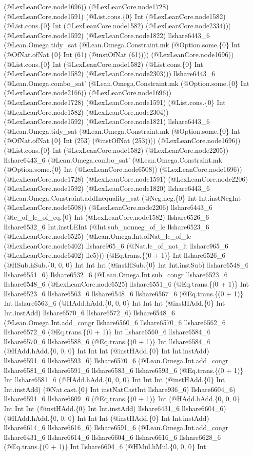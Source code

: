 \documentclass[11pt]{article}
\begin{document}
(@LexLeanCore.node1696)) (@LexLeanCore.node1728) (@LexLeanCore.node1591) (@List.cons.\{0\} Int (@LexLeanCore.node1582) (@List.cons.\{0\} Int (@LexLeanCore.node1582) (@LexLeanCore.node2334))) (@LexLeanCore.node1592) (@LexLeanCore.node1822) llshare6443\_6 (@Lean.Omega.tidy\_sat (@Lean.Omega.Constraint.mk (@Option.some.\{0\} Int (@OfNat.ofNat.\{0\} Int (61) (@instOfNat (61)))) (@LexLeanCore.node1696)) (@List.cons.\{0\} Int (@LexLeanCore.node1582) (@List.cons.\{0\} Int (@LexLeanCore.node1582) (@LexLeanCore.node2303))) llshare6443\_6 (@Lean.Omega.combo\_sat' (@Lean.Omega.Constraint.mk (@Option.some.\{0\} Int (@LexLeanCore.node2166)) (@LexLeanCore.node1696)) (@LexLeanCore.node1728) (@LexLeanCore.node1591) (@List.cons.\{0\} Int (@LexLeanCore.node1582) (@LexLeanCore.node2304)) (@LexLeanCore.node1592) (@LexLeanCore.node1821) llshare6443\_6 (@Lean.Omega.tidy\_sat (@Lean.Omega.Constraint.mk (@Option.some.\{0\} Int (@OfNat.ofNat.\{0\} Int (253) (@instOfNat (253)))) (@LexLeanCore.node1696)) (@List.cons.\{0\} Int (@LexLeanCore.node1582) (@LexLeanCore.node2205)) llshare6443\_6 (@Lean.Omega.combo\_sat' (@Lean.Omega.Constraint.mk (@Option.some.\{0\} Int (@LexLeanCore.node6508)) (@LexLeanCore.node1696)) (@LexLeanCore.node1728) (@LexLeanCore.node1591) (@LexLeanCore.node2206) (@LexLeanCore.node1592) (@LexLeanCore.node1820) llshare6443\_6 (@Lean.Omega.Constraint.addInequality\_sat (@Neg.neg.\{0\} Int Int.instNegInt (@LexLeanCore.node6508)) (@LexLeanCore.node2206) llshare6443\_6 (@le\_of\_le\_of\_eq.\{0\} Int (@LexLeanCore.node1582) llshare6526\_6 llshare6532\_6 Int.instLEInt (@Int.sub\_nonneg\_of\_le llshare6523\_6 (@LexLeanCore.node6525) (@Lean.Omega.Int.ofNat\_le\_of\_le (@LexLeanCore.node6402) llshare965\_6 (@Nat.le\_of\_not\_lt llshare965\_6 (@LexLeanCore.node6402) llc5))) (@Eq.trans.\{(0 + 1)\} Int llshare6526\_6 (@HSub.hSub.\{0, 0, 0\} Int Int Int (@instHSub.\{0\} Int Int.instSub) llshare6548\_6 llshare6551\_6) llshare6532\_6 (@Lean.Omega.Int.sub\_congr llshare6523\_6 llshare6548\_6 (@LexLeanCore.node6525) llshare6551\_6 (@Eq.trans.\{(0 + 1)\} Int llshare6523\_6 llshare6563\_6 llshare6548\_6 llshare6567\_6 (@Eq.trans.\{(0 + 1)\} Int llshare6563\_6 (@HAdd.hAdd.\{0, 0, 0\} Int Int Int (@instHAdd.\{0\} Int Int.instAdd) llshare6570\_6 llshare6572\_6) llshare6548\_6 (@Lean.Omega.Int.add\_congr llshare6560\_6 llshare6570\_6 llshare6562\_6 llshare6572\_6 (@Eq.trans.\{(0 + 1)\} Int llshare6560\_6 llshare6584\_6 llshare6570\_6 llshare6588\_6 (@Eq.trans.\{(0 + 1)\} Int llshare6584\_6 (@HAdd.hAdd.\{0, 0, 0\} Int Int Int (@instHAdd.\{0\} Int Int.instAdd) llshare6591\_6 llshare6593\_6) llshare6570\_6 (@Lean.Omega.Int.add\_congr llshare6581\_6 llshare6591\_6 llshare6583\_6 llshare6593\_6 (@Eq.trans.\{(0 + 1)\} Int llshare6581\_6 (@HAdd.hAdd.\{0, 0, 0\} Int Int Int (@instHAdd.\{0\} Int Int.instAdd) (@Nat.cast.\{0\} Int instNatCastInt llshare936\_6) llshare6604\_6) llshare6591\_6 llshare6609\_6 (@Eq.trans.\{(0 + 1)\} Int (@HAdd.hAdd.\{0, 0, 0\} Int Int Int (@instHAdd.\{0\} Int Int.instAdd) llshare6431\_6 llshare6604\_6) (@HAdd.hAdd.\{0, 0, 0\} Int Int Int (@instHAdd.\{0\} Int Int.instAdd) llshare6614\_6 llshare6616\_6) llshare6591\_6 (@Lean.Omega.Int.add\_congr llshare6431\_6 llshare6614\_6 llshare6604\_6 llshare6616\_6 llshare6628\_6 (@Eq.trans.\{(0 + 1)\} Int llshare6604\_6 (@HMul.hMul.\{0, 0, 0\} Int 
\end{document}
